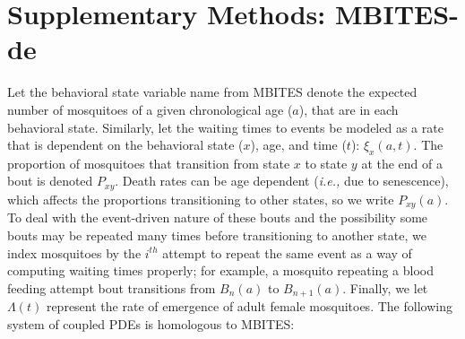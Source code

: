 \documentclass{article}
\begin{document}

\newcommand{\eg}{{\em e.g., }}
\newcommand{\ie}{{\em i.e., }}


\section{Supplementary Methods: MBITES-de}

Let the behavioral state variable name from MBITES denote the expected number of mosquitoes of a given chronological age ($a$), that are in each behavioral state. Similarly, let the waiting times to events be modeled as a rate that is dependent on the behavioral state ($x$), age, and time ($t$): $\xi_x(a,t)$. The proportion of mosquitoes that transition from state $x$ to state $y$ at the end of a bout is denoted $P_{xy}$. Death rates can be age dependent (\ie due to senescence), which affects the proportions transitioning to other states, so we write $P_{xy}(a)$. To deal with the event-driven nature of these bouts and the possibility some bouts may be repeated many times before transitioning to another state, we index mosquitoes by the $i^{th}$ attempt to repeat the same event as a way of computing waiting times properly; for example, a mosquito repeating a blood feeding attempt bout transitions from $B_n(a)$ to $B_{n+1}(a)$. Finally, we let $\Lambda(t)$ represent the rate of emergence of adult female mosquitoes. The following system of coupled PDEs is homologous to MBITES: 
\end{document}
